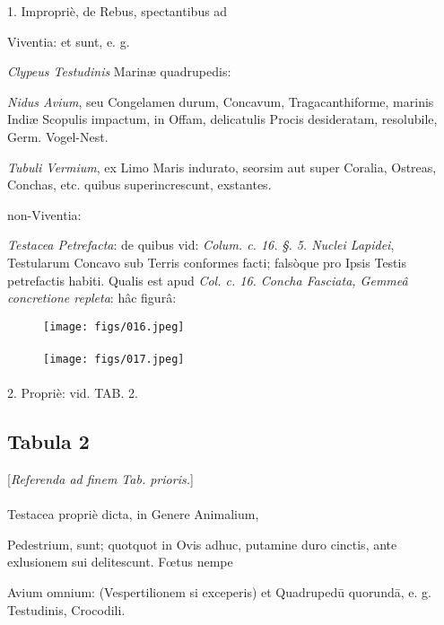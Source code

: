 \documentclass[a4paper, 11pt, oneside, polutonikogreek, german]{article}
\begin{document}
1. Impropriè, de Rebus, spectantibus ad

Viventia: et sunt, e. g.

\emph{Clypeus Testudinis} Marinæ quadrupedis:

\emph{Nidus Avium}, seu Congelamen durum, Concavum, Tragacanthiforme, marinis Indiæ Scopulis impactum, in Offam, delicatulis Procis desideratam, resolubile, Germ. Vogel-Nest.

\emph{Tubuli Vermium}, ex Limo Maris indurato, seorsim aut super Coralia, Ostreas, Conchas, etc. quibus superincrescunt, exstantes.

non-Viventia:

\emph{Testacea Petrefacta}: de quibus vid: \emph{Colum. c. 16. §. 5. Nuclei Lapidei}, Testularum Concavo sub Terris conformes facti; falsòque pro Ipsis Testis petrefactis habiti. Qualis est apud \emph{Col. c. 16. Concha Fasciata, Gemmeâ concretione repleta}: hâc figurâ:

\begin{figure}[H]
\centering
\texttt{[image: figs/016.jpeg]}
\end{figure}
\paragraph{}

\begin{figure}[H]
\centering
\texttt{[image: figs/017.jpeg]}
\end{figure}
\paragraph{}

2. Propriè: vid. TAB. 2.
\clearpage
\subsection{Tabula 2}
\begin{center}
[\emph{Referenda ad finem Tab. prioris.}]
\end{center}
\paragraph{}
Testacea propriè dicta, in Genere Animalium,

Pedestrium, sunt; quotquot in Ovis adhuc, putamine duro cinctis, ante exlusionem sui delitescunt. Fœtus nempe

Avium omnium: (Vespertilionem si exceperis) et Quadrupedū quorundā, e. g. Testudinis, Crocodili.
\end{document}
